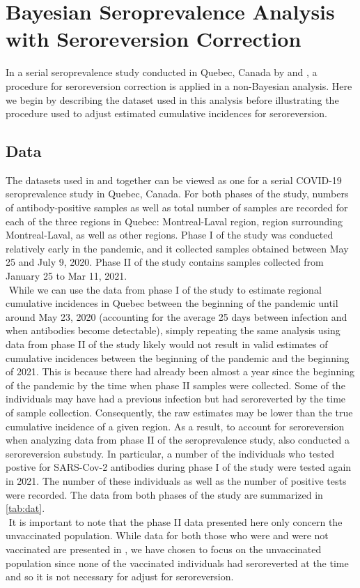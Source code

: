 \section{Bayesian Seroprevalence Analysis with Seroreversion Correction}
In a serial seroprevalence study conducted in Quebec, Canada by \cite{lewin2021sars} and \cite{lewin2022seroprevalence}, a procedure for seroreversion correction is applied in a non-Bayesian analysis. Here we begin by describing the dataset used in this analysis before illustrating the procedure used to adjust estimated cumulative incidences for seroreversion.
\subsection{Data}
The datasets used in \cite{lewin2021sars} and \cite{lewin2022seroprevalence} together can be viewed as one for a serial COVID-19 seroprevalence study in Quebec, Canada. For both phases of the study, numbers of antibody-positive samples as well as total number of samples are recorded for each of the three regions in Quebec: Montreal-Laval region, region surrounding Montreal-Laval, as well as other regions. Phase I of the study was conducted relatively early in the pandemic, and it collected samples obtained between May 25 and July 9, 2020. Phase II of the study contains samples collected from  January 25 to Mar 11, 2021.\\
\newline $ $
While we can use the data from phase I of the study to estimate regional cumulative incidences in Quebec between the beginning of the pandemic until around May 23, 2020 (accounting for the average 25 days between infection and when antibodies become detectable), simply repeating the same analysis using data from phase II of the study likely would not result in valid estimates of cumulative incidences between the beginning of the pandemic and the beginning of 2021. This is because there had already been almost a year since the beginning of the pandemic by the time when phase II samples were collected. Some of the individuals may have had a previous infection but had seroreverted by the time of sample collection. Consequently, the raw estimates may be lower than the true cumulative incidence of a given region. As a result, to account for seroreversion when analyzing data from phase II of the seroprevalence study, \cite{lewin2022seroprevalence} also conducted a seroreversion substudy. In particular, a number of the individuals who tested postive for SARS-Cov-2 antibodies during phase I of the study were tested again in 2021. The number of these individuals as well as the number of positive tests were recorded. The data from both phases of the study are summarized in \cref{tab:dat}.\\
\newline $ $
It is important to note that the phase II data presented here only concern the unvaccinated population. While data for both those who were and were not vaccinated are presented in \cite{lewin2022seroprevalence}, we have chosen to focus on the unvaccinated population since none of the vaccinated individuals had seroreverted at the time and so it is not necessary for adjust for seroreversion.

